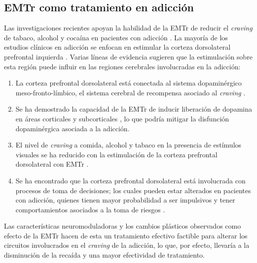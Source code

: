 \subsection{EMTr como tratamiento en adicción}
Las investigaciones recientes apoyan la habilidad de la EMTr de reducir el \textit{craving} de tabaco, alcohol y cocaína en pacientes con adicción \parencite{Barr2011}.
La mayoría de los estudios clínicos en adicción se enfocan en estimular la corteza dorsolateral prefrontal izquierda \parencite{Bellamoli2014a,Barr2011,Ekhtiari2019}.
Varias líneas de evidencia sugieren que la estimulación sobre esta región puede influir en las regiones cerebrales involucradas en la adicción:
\begin{enumerate}
    \item La corteza prefrontal dorsolateral está conectada al sistema dopaminérgico meso-fronto-límbico, el sistema cerebral de recompensa asociado al \textit{craving} \parencite{Barr2011}.
    \item Se ha demostrado la capacidad de la EMTr de inducir liberación de dopamina en áreas corticales y subcorticales \parencite{Cho2009,Strafella2001}, lo que podría mitigar la disfunción dopaminérgica asociada a la adicción.
    \item El nivel de \textit{craving} a comida, alcohol y tabaco en la presencia de estímulos visuales se ha reducido con la estimulación de la corteza prefrontal dorsolateral con EMTr \parencite{Amiaz2009}.
    \item Se ha encontrado que la corteza prefrontal dorsolateral está involucrada con procesos de toma de decisiones; los cuales pueden estar alterados en pacientes con adicción, quienes tienen mayor probabilidad a ser impulsivos y tener comportamientos asociados a la toma de riesgos \parencite{Barr2011}.
\end{enumerate}
Las características neuromoduladoras y los cambios plásticos observados como efecto de la EMTr hacen de esta un tratamiento efectivo factible para alterar los circuitos involucrados en el \textit{craving} de la adicción, lo que, por efecto, llevaría a la disminución de la recaída y una mayor efectividad de tratamiento.

